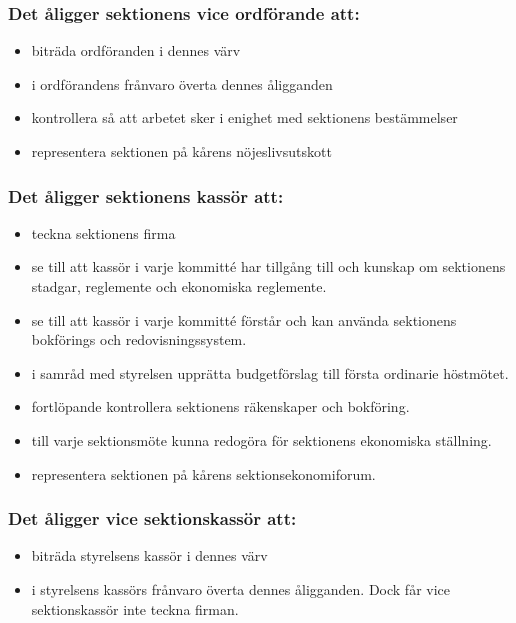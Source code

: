 \subsubsection{Det åligger sektionens vice ordförande att:}

\begin{itemize}
  \item biträda ordföranden i dennes värv 
  \item i ordförandens frånvaro överta dennes åligganden 
  \item kontrollera så att arbetet sker i enighet med sektionens bestämmelser 
  \item representera sektionen på kårens nöjeslivsutskott
\end{itemize}

\subsubsection{Det åligger sektionens kassör att:}

\begin{itemize}
  \item teckna sektionens firma
  \item se till att kassör i varje kommitté har tillgång till och kunskap om sektionens stadgar, reglemente och ekonomiska reglemente.
  \item se till att kassör i varje kommitté förstår och kan använda sektionens bokförings och redovisningssystem.
  \item i samråd med styrelsen upprätta budgetförslag till första ordinarie höstmötet.
  \item fortlöpande kontrollera sektionens räkenskaper och bokföring.
  \item till varje sektionsmöte kunna redogöra för sektionens ekonomiska ställning.
  \item representera sektionen på kårens sektionsekonomiforum.
\end{itemize}

\subsubsection{Det åligger vice sektionskassör att:}

\begin{itemize}
  \item biträda styrelsens kassör i dennes värv
  \item i styrelsens kassörs frånvaro överta dennes åligganden. 
        Dock får vice sektionskassör inte teckna firman.
\end{itemize}

